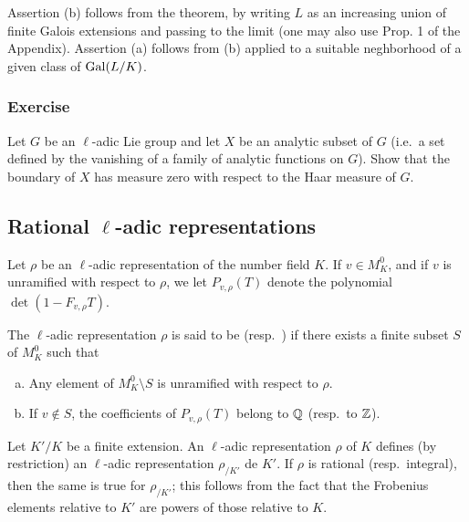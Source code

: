 Assertion (b) follows from the theorem, by writing $L$ as an increasing union
of finite Galois extensions and passing to the limit (one may also use Prop. 1
of the Appendix). Assertion (a) follows from (b) applied to a suitable
neghborhood of a given class of $\operatorname{Gal}(L/K)$.

\subsubsection*{Exercise}
Let $G$ be an $\ell$-adic Lie group and let $X$ be an analytic subset of $G$
(i.e.\ a set defined by the vanishing of a family of analytic functions on $G$).
Show that the boundary of $X$ has measure zero
\dpage
with respect to the Haar measure of $G$.

\subsection{Rational \texorpdfstring{$\ell$}{ℓ}-adic representations}
\label{sec:I_23}
Let $\rho$ be an $\ell$-adic representation of the number field $K$. If $v \in
M_K^0$, and if $v$ is unramified with respect to $\rho$, we let $P_{v,\rho}(T)$
denote the polynomial $\det(1 - F_{v,\rho} T)$.

\begin{mydef}
The $\ell$-adic representation $\rho$ is said to be
 (resp.\ 
) if there exists a finite
subset $S$ of $M_K^0$ such that
\begin{enumerate}[(a)]
	\item Any element of $M_K^0 \setminus S$ is unramified with respect to 
	$\rho$.
	\item If $v \not\in S$, the coefficients of $P_{v,\rho}(T)$ belong to
		$\mathbb{Q}$ (resp.\ to $\mathbb{Z}$).
\end{enumerate}
\end{mydef}

\begin{obs}\label{rmk:I_23_1}
	Let $K'/K$ be a finite extension. An $\ell$-adic representation $\rho$
	of $K$ defines (by restriction) an $\ell$-adic representation
	$\rho_{/K'}$ de $K'$. If $\rho$ is rational (resp.\ integral), then the
	same is true for $\rho_{/K'}$; this follows from the fact that the
	Frobenius elements relative to $K'$ are powers of those relative to
	$K$.
\end{obs}

